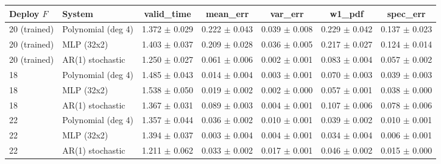\begin{tabular}{llccccc}
\toprule
Deploy $F$ & System & valid\_time & mean\_err & var\_err & w1\_pdf & spec\_err \\
\midrule
20 (trained) & Polynomial (deg 4) & 1.372 $\pm$ 0.029 & 0.222 $\pm$ 0.043 & 0.039 $\pm$ 0.008 & 0.229 $\pm$ 0.042 & 0.137 $\pm$ 0.023 \\
20 (trained) & MLP (32x2) & 1.403 $\pm$ 0.037 & 0.209 $\pm$ 0.028 & 0.036 $\pm$ 0.005 & 0.217 $\pm$ 0.027 & 0.124 $\pm$ 0.014 \\
20 (trained) & AR(1) stochastic & 1.250 $\pm$ 0.027 & 0.061 $\pm$ 0.006 & 0.002 $\pm$ 0.001 & 0.083 $\pm$ 0.004 & 0.057 $\pm$ 0.002 \\
\midrule
18 & Polynomial (deg 4) & 1.485 $\pm$ 0.043 & 0.014 $\pm$ 0.004 & 0.003 $\pm$ 0.001 & 0.070 $\pm$ 0.003 & 0.039 $\pm$ 0.003 \\
18 & MLP (32x2) & 1.538 $\pm$ 0.050 & 0.019 $\pm$ 0.002 & 0.002 $\pm$ 0.000 & 0.057 $\pm$ 0.001 & 0.038 $\pm$ 0.000 \\
18 & AR(1) stochastic & 1.367 $\pm$ 0.031 & 0.089 $\pm$ 0.003 & 0.004 $\pm$ 0.001 & 0.107 $\pm$ 0.006 & 0.078 $\pm$ 0.006 \\
\midrule
22 & Polynomial (deg 4) & 1.357 $\pm$ 0.044 & 0.036 $\pm$ 0.002 & 0.010 $\pm$ 0.001 & 0.039 $\pm$ 0.002 & 0.010 $\pm$ 0.001 \\
22 & MLP (32x2) & 1.394 $\pm$ 0.037 & 0.003 $\pm$ 0.004 & 0.004 $\pm$ 0.001 & 0.034 $\pm$ 0.004 & 0.006 $\pm$ 0.001 \\
22 & AR(1) stochastic & 1.211 $\pm$ 0.062 & 0.033 $\pm$ 0.002 & 0.017 $\pm$ 0.001 & 0.046 $\pm$ 0.002 & 0.015 $\pm$ 0.000 \\
\bottomrule
\end{tabular}
